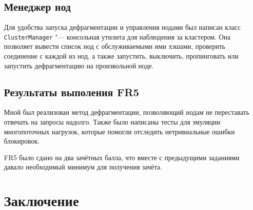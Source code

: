 \documentclass[a4paper]{article}
\renewcommand{\t}{\texttt}
\begin{document}
\subsection{Менеджер нод}
  Для удобства запуска дефрагментации и управления нодами был написан класс \t{ClusterManager} "--- консольная
  утилита для наблюдения за кластером. Она позволяет вывести список нод с обслуживаемыми ими хэшами, проверить
  соединение с каждой из нод, а также запустить, выключить, пропинговать или запустить дефрагментацию
  на произвольной ноде.

\subsection{Результаты выполения FR5}
  Мной был реализован метод дефрагментации, позволяющий нодам не переставать отвечать на запросы надолго.
  Также было написаны тесты для эмуляции многопоточных нагрузок, которые помогли отследить нетривиальные
  ошибки блокировок.

  FR5 было сдано на два зачётных балла, что вместе с предыдущими заданиями давало необходимый минимум для
  получения зачёта.

\section{Заключение}
\end{document}
